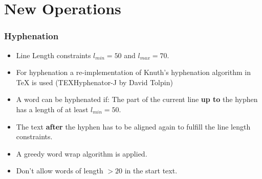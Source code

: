 \documentclass{beamer}
\begin{document}
\section{New Operations}
\begin{frame}
\frametitle{Hyphenation}


\begin{itemize}
\item Line Length constraints $l_{min}=50$ and $l_{max}=70.$



\item For hyphenation a re-implementation of Knuth's hyphenation algorithm in
TeX is used (TEXHyphenator-J by David Tolpin) 

\item A word can be hyphenated if: The part of the current line \textbf{up to} the hyphen has a length of at least $l_{min}=50.$

\item The text \textbf{after} the hyphen has to be aligned again to fulfill the line length
constraints.



\item A greedy word wrap algorithm is applied. 

\item Don't allow words of length $>20$ in the start text.
\end{itemize}

\end{frame}
\end{document}
